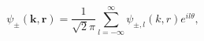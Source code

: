 \begin{equation}
\label{Eq_0213}
\psi_{\pm}(\mathbf{k}, \mathbf{r})
  = \frac{1}{\sqrt{2}\pi} \sum^{\infty}_{l=-\infty}
  \psi_{\pm,l}(k,r) e^{il \theta},
\end{equation}

